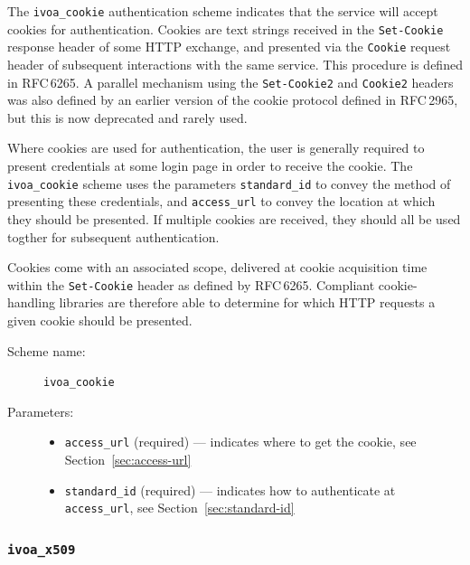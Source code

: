 \documentclass[11pt,a4paper]{ivoa}
\newcommand{\rfc}[1]{RFC\,#1}
\begin{document}
The \verb|ivoa_cookie| authentication scheme indicates that the service
will accept cookies for authentication.
Cookies are text strings received in the {\tt Set-Cookie}
response header of some HTTP exchange,
and presented via the {\tt Cookie} request header of subsequent
interactions with the same service.
This procedure is defined in \rfc{6265}.
A parallel mechanism using the {\tt Set-Cookie2} and {\tt Cookie2}
headers was also defined by an earlier version of the cookie protocol
defined in \rfc{2965}, but this is now deprecated and rarely used.

Where cookies are used for authentication, the user is generally required
to present credentials at some login page in order to receive the cookie.
The \verb|ivoa_cookie| scheme uses the parameters 
\verb|standard_id| to convey the method of presenting these credentials, and
\verb|access_url| to convey the location at which they should be presented.
If multiple cookies are received, they should all be used togther
for subsequent authentication.

Cookies come with an associated scope,
delivered at cookie acquisition time within the {\tt Set-Cookie} header
as defined by \rfc{6265}.
Compliant cookie-handling libraries are therefore able to determine
for which HTTP requests a given cookie should be presented.

\begin{description}
  \item[Scheme name:] \verb|ivoa_cookie|
  \item[Parameters:] \mbox{}
  \begin{itemize}
    \item \verb|access_url| (required) ---
          indicates where to get the cookie,
          see Section~\ref{sec:access-url}
    \item \verb|standard_id| (required) ---
          indicates how to authenticate at \verb|access_url|,
          see Section~\ref{sec:standard-id}
  \end{itemize}
\end{description}


\subsubsection{\mbox{\tt ivoa\_x509}}\label{sec:ivoa-x509}

\end{document}
